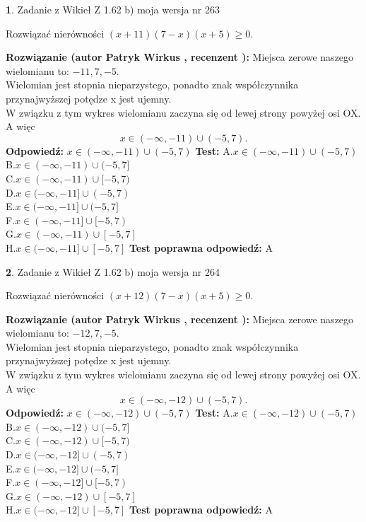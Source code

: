 \documentclass[12pt, a4paper]{article}
\theoremstyle{definition} %
\newtheorem{zad}{}
\newcommand{\zadStart}[1]{\begin{zad}#1\newline}
\newcommand{\zadStop}{\end{zad}}
\newcommand{\rozwStart}[2]{\noindent \textbf{Rozwiązanie (autor #1 , recenzent #2): }\newline}
\newcommand{\rozwStop}{\newline}
\newcommand{\odpStart}{\noindent \textbf{Odpowiedź:}\newline}
\newcommand{\odpStop}{\newline}
\newcommand{\testStart}{\noindent \textbf{Test:}\newline}
\newcommand{\testStop}{\newline}
\newcommand{\kluczStart}{\noindent \textbf{Test poprawna odpowiedź:}\newline}
\newcommand{\kluczStop}{\newline}
\begin{document}
\zadStart{Zadanie z Wikieł Z 1.62 b) moja wersja nr 263}

Rozwiązać nierówności $(x+11)(7-x)(x+5)\ge0$.
\zadStop
\rozwStart{Patryk Wirkus}{}
Miejsca zerowe naszego wielomianu to: $-11, 7, -5$.\\
Wielomian jest stopnia nieparzystego, ponadto znak współczynnika przy\linebreak najwyższej potędze x jest ujemny.\\ W związku z tym wykres wielomianu zaczyna się od lewej strony powyżej osi OX. A więc $$x \in (-\infty,-11) \cup (-5,7).$$
\rozwStop
\odpStart
$x \in (-\infty,-11) \cup (-5,7)$
\odpStop
\testStart
A.$x \in (-\infty,-11) \cup (-5,7)$\\
B.$x \in (-\infty,-11) \cup (-5,7]$\\
C.$x \in (-\infty,-11) \cup [-5,7)$\\
D.$x \in (-\infty,-11] \cup (-5,7)$\\
E.$x \in (-\infty,-11] \cup (-5,7]$\\
F.$x \in (-\infty,-11] \cup [-5,7)$\\
G.$x \in (-\infty,-11) \cup [-5,7]$\\
H.$x \in (-\infty,-11] \cup [-5,7]$
\testStop
\kluczStart
A
\kluczStop



\zadStart{Zadanie z Wikieł Z 1.62 b) moja wersja nr 264}

Rozwiązać nierówności $(x+12)(7-x)(x+5)\ge0$.
\zadStop
\rozwStart{Patryk Wirkus}{}
Miejsca zerowe naszego wielomianu to: $-12, 7, -5$.\\
Wielomian jest stopnia nieparzystego, ponadto znak współczynnika przy\linebreak najwyższej potędze x jest ujemny.\\ W związku z tym wykres wielomianu zaczyna się od lewej strony powyżej osi OX. A więc $$x \in (-\infty,-12) \cup (-5,7).$$
\rozwStop
\odpStart
$x \in (-\infty,-12) \cup (-5,7)$
\odpStop
\testStart
A.$x \in (-\infty,-12) \cup (-5,7)$\\
B.$x \in (-\infty,-12) \cup (-5,7]$\\
C.$x \in (-\infty,-12) \cup [-5,7)$\\
D.$x \in (-\infty,-12] \cup (-5,7)$\\
E.$x \in (-\infty,-12] \cup (-5,7]$\\
F.$x \in (-\infty,-12] \cup [-5,7)$\\
G.$x \in (-\infty,-12) \cup [-5,7]$\\
H.$x \in (-\infty,-12] \cup [-5,7]$
\testStop
\kluczStart
A
\kluczStop
\end{document}
